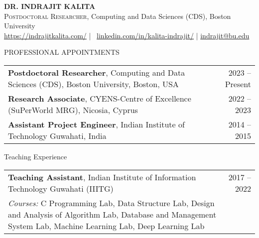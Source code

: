 \documentclass{resume} %
\begin{document}
	\begin{center}
		\textbf{\textsc{DR. INDRAJIT KALITA}} \\
		\textsc{Postdoctoral Researcher}, Computing and Data Sciences (CDS), Boston University \\
		\href{https://indrajitkalita.com/}{https://indrajitkalita.com/} \hspace{1em} | \hspace{1em} \faLinkedin \ \href{https://linkedin.com/in/kalita-indrajit/}{linkedin.com/in/kalita-indrajit/}  \hspace{1em} | \hspace{1em} \href{mailto:indrajit@bu.edu}{indrajit@bu.edu} \\
	\end{center}
\vspace{-5px}
\begin{rSection}{PROFESSIONAL APPOINTMENTS}
\vspace{-5px}
\begin{tabular}{p{\dimexpr\textwidth-4cm}r}
	\textbf{Postdoctoral Researcher}, Computing and Data Sciences (CDS), Boston University, Boston, USA & 2023 -- Present \\
	\textbf{Research Associate}, CYENS-Centre of Excellence (SuPerWorld MRG), Nicosia, Cyprus & 2022 -- 2023 \\
	\textbf{Assistant Project Engineer}, Indian Institute of Technology Guwahati, India & 2014 -- 2015 \\
\end{tabular}
\end{rSection}
\vspace{-5px}
\begin{rSection}{Teaching Experience}
	\vspace{-4px}
	\begin{tabular}{p{\dimexpr\textwidth-4cm}r}
		\textbf{Teaching Assistant}, Indian Institute of Information Technology Guwahati (IIITG) & 2017 -- 2022 \\
		\textit{Courses:} C Programming Lab, Data Structure Lab, Design and Analysis of Algorithm Lab, Database and Management System Lab, Machine Learning Lab, Deep Learning Lab
	\end{tabular}
\end{rSection}
\end{document}
